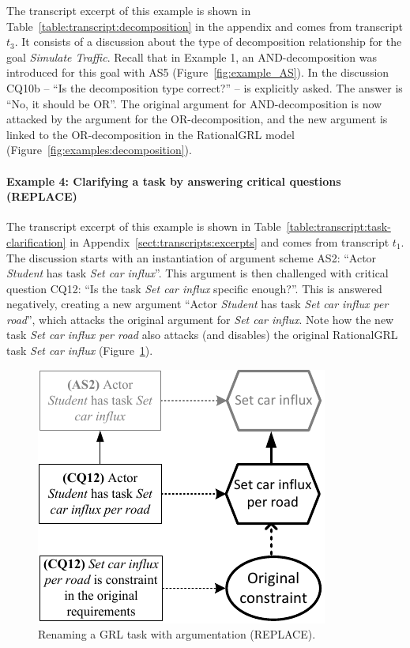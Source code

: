 The transcript excerpt of this example is shown in Table~\ref{table:transcript:decomposition} in the appendix and comes from transcript $t_3$. It consists of a discussion about the type of decomposition relationship for the goal \emph{Simulate Traffic}. Recall that in Example 1, an AND-decomposition was introduced for this goal with AS5 (Figure~\ref{fig:example_AS}). In the discussion CQ10b -- ``Is the decomposition type correct?'' -- is explicitly asked. The answer is ``No, it should be OR''. The original argument for AND-decomposition is now attacked  by the argument for the OR-decomposition, and the new argument is linked to the OR-decomposition in the RationalGRL model (Figure~\ref{fig:examples:decomposition}). 

\paragraph{Example 4: Clarifying a task by answering critical questions (\textsf{REPLACE})}

The transcript excerpt of this example is shown in Table~\ref{table:transcript:task-clarification} in Appendix~\ref{sect:transcripts:excerpts} and comes from transcript $t_1$. The discussion starts with an instantiation of argument scheme AS2: ``Actor \emph{Student} has task \emph{Set car influx}''. This argument is then challenged with critical question CQ12: ``Is the task \emph{Set car influx} specific enough?''. This is answered negatively, creating a new argument ``Actor \emph{Student} has task \emph{Set car influx per road}'', which attacks the original argument for \emph{Set car influx}. Note how the new task \emph{Set car influx per road} also attacks (and disables) the original RationalGRL task \emph{Set car influx} (Figure~\ref{fig:examples:clarification}). 

\begin{figure}[b]
\centering
\includegraphics[]{img/fig_example_rename.pdf}
\caption{Renaming a GRL task with argumentation (\textsf{REPLACE)}.}
\label{fig:examples:clarification}
\end{figure}

